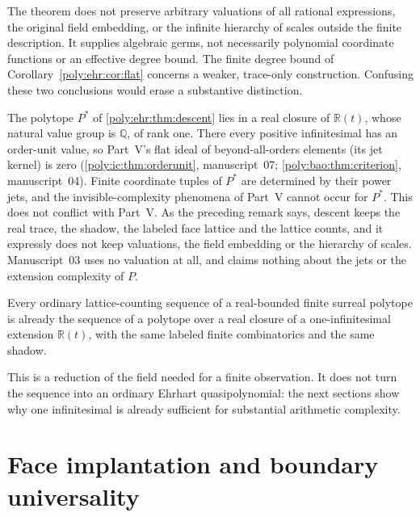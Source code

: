 \documentclass[11pt,a4paper]{article}
\numberwithin{equation}{section}
\theoremstyle{plain}
\newcommand{\wtag}{\textup{[write]}}%
\newcommand{\R}{\mathbb R}
\newcommand{\Q}{\mathbb Q}
\begin{document}
\begin{remark}
The theorem does not preserve arbitrary valuations of all rational
expressions, the original field embedding, or the infinite hierarchy of
scales outside the finite description. It supplies algebraic germs, not
necessarily polynomial coordinate functions or an effective degree bound.
The finite degree bound of Corollary~\ref{poly:ehr:cor:flat} concerns a weaker,
trace-only construction. Confusing these two conclusions would erase a
substantive distinction.
\end{remark}

\begin{remark}[\wtag{} Descent and Part~V]\label{poly:ehr:rem:descent-rank-one}
The polytope $P^*$ of \cref{poly:ehr:thm:descent} lies in a real closure of
$\R(t)$, whose natural value group is $\Q$, of rank one. There every
positive infinitesimal has an order-unit value, so Part~V's flat ideal of
beyond-all-orders elements (its jet kernel) is zero
(\cref{poly:ic:thm:orderunit}, manuscript~07;
\cref{poly:bao:thm:criterion}, manuscript~04). Finite coordinate tuples of
$P^*$ are determined by their power jets, and the invisible-complexity
phenomena of Part~V cannot occur for $P^*$. This does not conflict with
Part~V. As the preceding remark says, descent keeps the real trace, the
shadow, the labeled face lattice and the lattice counts, and it expressly
does not keep valuations, the field embedding or the hierarchy of scales.
Manuscript~03 uses no valuation at all, and claims nothing about the jets or
the extension complexity of $P$.
\end{remark}

\begin{corollary}
Every ordinary lattice-counting sequence of a real-bounded finite surreal
polytope is already the sequence of a polytope over a real closure of a
one-infinitesimal extension $\R(t)$, with the same labeled finite
combinatorics and the same shadow.
\end{corollary}

This is a reduction of the field needed for a finite observation. It does
not turn the sequence into an ordinary Ehrhart quasipolynomial: the next
sections show why one infinitesimal is already sufficient for substantial
arithmetic complexity.

\section{Face implantation and boundary universality}\label{poly:ehr:sec:implant}
\end{document}
